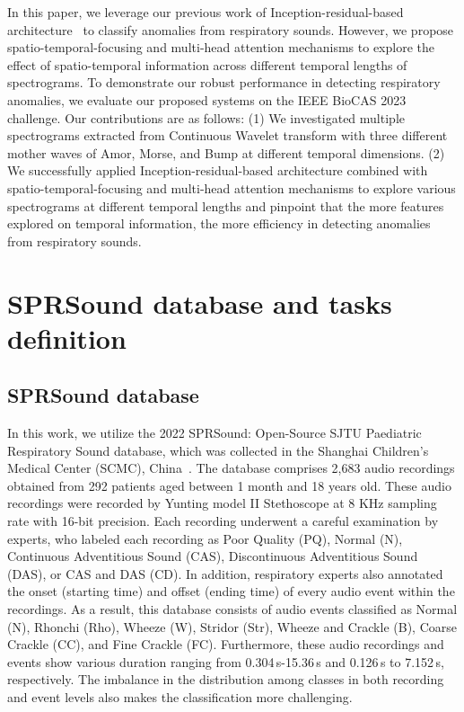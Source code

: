 \documentclass[conference]{IEEEtran}
\begin{document}
In this paper, we leverage our previous work of Inception-residual-based architecture~\cite{pham2022wider} to classify anomalies from respiratory sounds. However, we propose spatio-temporal-focusing and multi-head attention mechanisms to explore the effect of spatio-temporal information across different temporal lengths of spectrograms. To demonstrate our robust performance in detecting respiratory anomalies, we evaluate our proposed systems on the IEEE BioCAS 2023 challenge. Our contributions are as follows: (1) We investigated multiple spectrograms extracted from Continuous Wavelet transform with three different mother waves of Amor, Morse, and Bump at different temporal dimensions. (2) We successfully applied Inception-residual-based architecture combined with spatio-temporal-focusing and multi-head attention mechanisms to explore various spectrograms at different temporal lengths and pinpoint that the more features explored on temporal information, the more efficiency in detecting anomalies from respiratory sounds.


\section{SPRSound database and tasks definition}
\label{dataset}
\subsection{SPRSound database}


In this work, we utilize the 2022 SPRSound: Open-Source SJTU Paediatric Respiratory Sound database, which was collected in the Shanghai Children’s Medical Center (SCMC), China~\cite{zhang2022sprsound}. The database comprises 2,683 audio recordings obtained from 292 patients aged between 1 month and 18 years old. These audio recordings were recorded by Yunting model II Stethoscope at 8 KHz sampling rate with 16-bit precision. Each recording underwent a careful examination by experts, who labeled each recording as Poor Quality (PQ), Normal (N), Continuous Adventitious Sound (CAS), Discontinuous Adventitious Sound (DAS), or CAS and DAS (CD). In addition, respiratory experts also annotated the onset (starting time) and offset (ending time) of every audio event within the recordings. As a result, this database  consists of audio events classified as Normal (N), Rhonchi (Rho), Wheeze (W), Stridor (Str), Wheeze and Crackle (B), Coarse Crackle (CC), and Fine Crackle (FC). Furthermore, these audio recordings and events show various duration ranging from 0.304\,s-15.36\,s and 0.126\,s to 7.152\,s, respectively. The imbalance in the distribution among classes in both recording and event levels also makes the classification more challenging.
\end{document}
